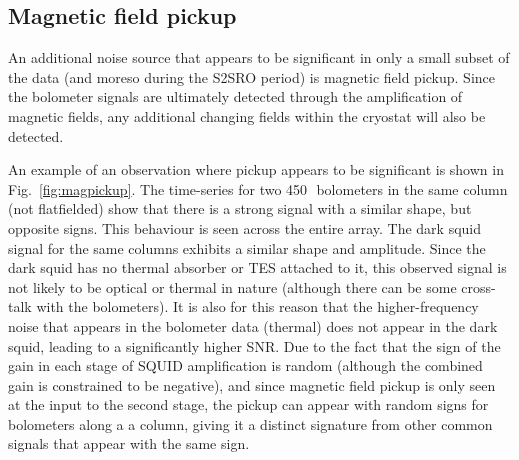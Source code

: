 \documentclass[useAMS,usenatbib,nofootinbib]{mn2e}
\newcommand{\snr}{SNR}
\begin{document}
\subsection{Magnetic field pickup}
\label{sec:magpickup}

An additional noise source that appears to be significant in only a
small subset of the data (and moreso during the S2SRO period) is
magnetic field pickup. Since the bolometer signals are ultimately
detected through the amplification of magnetic fields, any additional
changing fields within the cryostat will also be detected.

An example of an observation where pickup appears to be significant is
shown in Fig.~\ref{fig:magpickup}. The time-series for two
450\,\micron\ bolometers in the same column (not flatfielded) show
that there is a strong signal with a similar shape, but opposite
signs. This behaviour is seen across the entire array. The dark squid
signal for the same columns exhibits a similar shape and
amplitude. Since the dark squid has no thermal absorber or TES
attached to it, this observed signal is not likely to be optical or
thermal in nature (although there can be some cross-talk with the
bolometers). It is also for this reason that the higher-frequency
noise that appears in the bolometer data (thermal) does not appear in
the dark squid, leading to a significantly higher \snr. Due to the
fact that the sign of the gain in each stage of SQUID amplification is
random (although the combined gain is constrained to be negative), and
since magnetic field pickup is only seen at the input to the second
stage, the pickup can appear with random signs for bolometers along a
a column, giving it a distinct signature from other common signals
that appear with the same sign.
\end{document}
